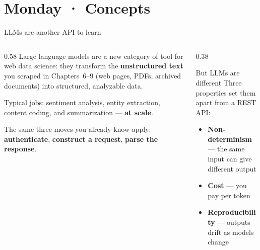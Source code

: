 \documentclass[9pt,aspectratio=169]{beamer}
\begin{document}
\section{Monday · Concepts}

\begin{frame}{LLMs are another API to learn}
    \begin{columns}[T]
        \begin{column}{0.58\textwidth}
            Large language models are a new category of tool for web data science: they transform the \textbf{unstructured text} you scraped in Chapters~6--9 (web pages, PDFs, archived documents) into structured, analyzable data.

            \vspace{0.8em}

            Typical jobs: sentiment analysis, entity extraction, content coding, and summarization --- \textbf{at scale}.

            \vspace{0.8em}

            The same three moves you already know apply: \textbf{authenticate}, \textbf{construct a request}, \textbf{parse the response}.
        \end{column}
        \begin{column}{0.38\textwidth}
            \begin{alertblock}{But LLMs are different}
                \footnotesize Three properties set them apart from a REST API:
                \begin{itemize}\footnotesize
                    \item \textbf{Non-determinism} --- the same input can give different output
                    \item \textbf{Cost} --- you pay per token
                    \item \textbf{Reproducibility} --- outputs drift as models change
                \end{itemize}
            \end{alertblock}
        \end{column}
    \end{columns}
\end{frame}
\end{document}
